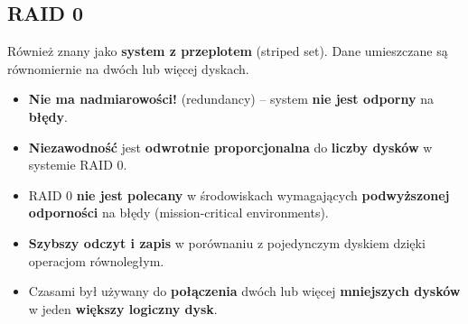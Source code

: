 \documentclass[a4paper]{article}
\begin{document}
\subsection{RAID 0}
Również znany jako \textbf{system z przeplotem} (striped set).
Dane umieszczane są równomiernie na dwóch lub więcej dyskach.\\


\begin{itemize}
    \item \textbf{Nie ma nadmiarowości!} (redundancy) – system \textbf{nie jest odporny} na \textbf{błędy}.
    \item  \textbf{Niezawodność} jest \textbf{odwrotnie proporcjonalna} do \textbf{liczby dysków} w systemie RAID 0.
    \item  RAID 0 \textbf{nie jest polecany} w środowiskach wymagających \textbf{podwyższonej odporności} na błędy (mission-critical environments).
    \item \textbf{Szybszy odczyt i zapis} w porównaniu z pojedynczym dyskiem dzięki operacjom równoległym.
    \item Czasami był używany do \textbf{połączenia} dwóch lub więcej \textbf{mniejszych dysków} w jeden \textbf{większy logiczny dysk}.
\end{itemize}
\end{document}
